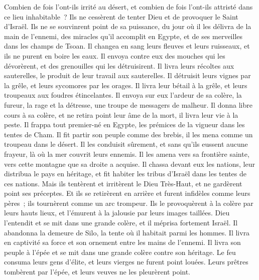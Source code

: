 \begin{multicols}{2}
Combien de fois l'ont-ils irrité au désert, et combien de fois l'ont-ils attristé dans ce lieu inhabitable~?
Ils ne cessèrent de tenter Dieu et de provoquer le Saint d'Israël.
Ils ne se souvinrent point de sa puissance, du jour où il les délivra de la main de l'ennemi,
des miracles qu'il accomplit en Egypte, et de ses merveilles dans les champs de Tsoan.
Il changea en sang leurs fleuves et leurs ruisseaux, et ils ne purent en boire les eaux.
Il envoya contre eux des mouches qui les dévorèrent, et des grenouilles qui les détruisirent.
Il livra leurs récoltes aux sauterelles, le produit de leur travail aux sauterelles.
Il détruisit leurs vignes par la grêle, et leurs sycomores par les orages.
Il livra leur bétail à la grêle, et leurs troupeaux aux foudres étincelantes.
Il envoya sur eux l'ardeur de sa colère, la fureur, la rage et la détresse, une troupe de messagers de malheur.
Il donna libre cours à sa colère, et ne retira point leur âme de la mort, il livra leur vie à la peste.
Il frappa tout premier-né en Egypte, les prémices de la vigueur dans les tentes de Cham.
Il fit partir son peuple comme des brebis, il les mena comme un troupeau dans le désert.
Il les conduisit sûrement, et sans qu'ils eussent aucune frayeur, là où la mer couvrit leurs ennemis.
Il les amena vers sa frontière sainte, vers cette montagne que sa droite a acquise.
Il chassa devant eux les nations, leur distribua le pays en héritage, et fit habiter les tribus d'Israël dans les tentes de ces nations.
Mais ils tentèrent et irritèrent le Dieu Très-Haut, et ne gardèrent point ses préceptes.
Et ils se retirèrent en arrière et furent infidèles comme leurs pères~; ils tournèrent comme un arc trompeur.
Ils le provoquèrent à la colère par leurs hauts lieux, et l'émurent à la jalousie par leurs images taillées.
Dieu l'entendit et se mit dans une grande colère, et il méprisa fortement Israël.
Il abandonna la demeure de Silo, la tente où il habitait parmi les hommes.
Il livra en captivité sa force et son ornement entre les mains de l'ennemi.
Il livra son peuple à l'épée et se mit dans une grande colère contre son héritage.
Le feu consuma leurs gens d'élite, et leurs vierges ne furent point louées.
Leurs prêtres tombèrent par l'épée, et leurs veuves ne les pleurèrent point.

\end{multicols}
